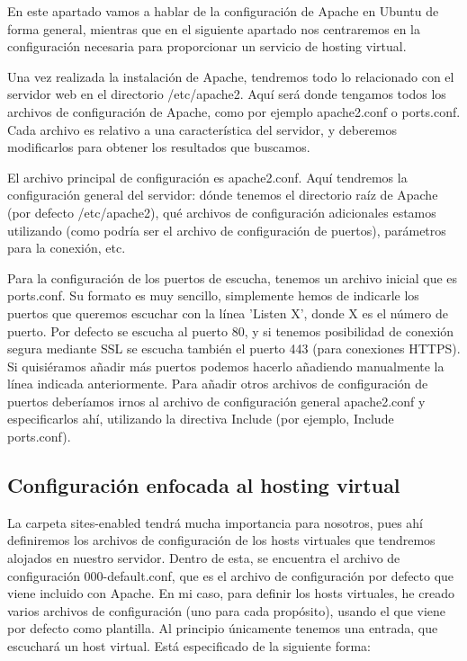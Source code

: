 \documentclass[a4paper, 10pt]{article} %
\begin{document}
En este apartado vamos a hablar de la configuración de Apache en Ubuntu de forma general, mientras que en el siguiente apartado nos centraremos en la configuración necesaria para proporcionar un servicio de hosting virtual. 

Una vez realizada la instalación de Apache, tendremos todo lo relacionado con el servidor web en el directorio /etc/apache2. Aquí será donde tengamos todos los archivos de configuración de Apache, como por ejemplo apache2.conf o ports.conf. Cada archivo es relativo a una característica del servidor, y deberemos modificarlos para obtener los resultados que buscamos. 

El archivo principal de configuración es apache2.conf. Aquí tendremos la configuración general del servidor: dónde tenemos el directorio raíz de Apache (por defecto /etc/apache2), qué archivos de configuración adicionales estamos utilizando (como podría ser el archivo de configuración de puertos), parámetros para la conexión, etc. 

Para la configuración de los puertos de escucha, tenemos un archivo inicial que es ports.conf. Su formato es muy sencillo, simplemente hemos de indicarle los puertos que queremos escuchar con la línea 'Listen X', donde X es el número de puerto. Por defecto se escucha al puerto 80, y si tenemos posibilidad de conexión segura mediante SSL se escucha también el puerto 443 (para conexiones HTTPS). Si quisiéramos añadir más puertos podemos hacerlo añadiendo manualmente la línea indicada anteriormente. Para añadir otros archivos de configuración de puertos deberíamos irnos al archivo de configuración general apache2.conf y especificarlos ahí, utilizando la directiva Include (por ejemplo, Include ports.conf).

\subsection{Configuración enfocada al hosting virtual}

La carpeta sites-enabled tendrá mucha importancia para nosotros, pues ahí definiremos los archivos de configuración de los hosts virtuales que tendremos alojados en nuestro servidor. Dentro de esta, se encuentra el archivo de configuración 000-default.conf, que es el archivo de configuración por defecto que viene incluido con Apache. En mi caso, para definir los hosts virtuales, he creado varios archivos de configuración (uno para cada propósito), usando el que viene por defecto como plantilla. Al principio únicamente tenemos una entrada, que escuchará un host virtual. Está especificado de la siguiente forma: 
\end{document}
